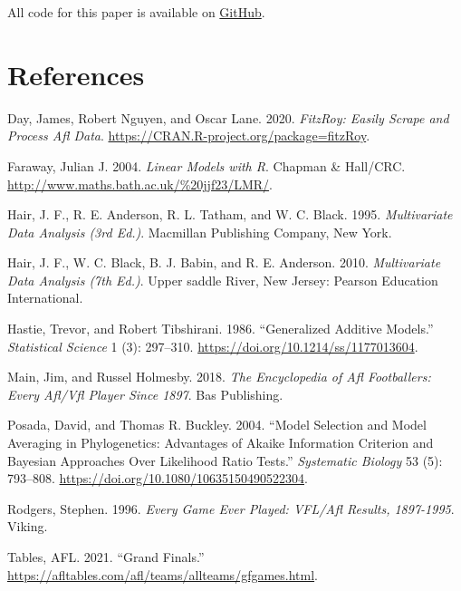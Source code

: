\documentclass{article}
\begin{document}
All code for this paper is available on \href{https://github.com/hendersontrent/phd-coursework/tree/main/olet5608}{GitHub}.

\pagebreak

\hypertarget{references}{%
\section*{References}\label{references}}

\hypertarget{refs}{}
\leavevmode\hypertarget{ref-fitzRoy}{}%
Day, James, Robert Nguyen, and Oscar Lane. 2020. \emph{FitzRoy: Easily Scrape and Process Afl Data}. \url{https://CRAN.R-project.org/package=fitzRoy}.

\leavevmode\hypertarget{ref-R:Faraway:2004}{}%
Faraway, Julian J. 2004. \emph{Linear Models with R}. Chapman \& Hall/CRC. \url{http://www.maths.bath.ac.uk/\%20jjf23/LMR/}.

\leavevmode\hypertarget{ref-multi2}{}%
Hair, J. F., R. E. Anderson, R. L. Tatham, and W. C. Black. 1995. \emph{Multivariate Data Analysis (3rd Ed.)}. Macmillan Publishing Company, New York.

\leavevmode\hypertarget{ref-multi1}{}%
Hair, J. F., W. C. Black, B. J. Babin, and R. E. Anderson. 2010. \emph{Multivariate Data Analysis (7th Ed.)}. Upper saddle River, New Jersey: Pearson Education International.

\leavevmode\hypertarget{ref-10.1214ux2fssux2f1177013604}{}%
Hastie, Trevor, and Robert Tibshirani. 1986. ``Generalized Additive Models.'' \emph{Statistical Science} 1 (3): 297--310. \url{https://doi.org/10.1214/ss/1177013604}.

\leavevmode\hypertarget{ref-everyone}{}%
Main, Jim, and Russel Holmesby. 2018. \emph{The Encyclopedia of Afl Footballers: Every Afl/Vfl Player Since 1897}. Bas Publishing.

\leavevmode\hypertarget{ref-10.1080ux2f10635150490522304}{}%
Posada, David, and Thomas R. Buckley. 2004. ``Model Selection and Model Averaging in Phylogenetics: Advantages of Akaike Information Criterion and Bayesian Approaches Over Likelihood Ratio Tests.'' \emph{Systematic Biology} 53 (5): 793--808. \url{https://doi.org/10.1080/10635150490522304}.

\leavevmode\hypertarget{ref-everygame}{}%
Rodgers, Stephen. 1996. \emph{Every Game Ever Played: VFL/Afl Results, 1897-1995}. Viking.

\leavevmode\hypertarget{ref-attendance}{}%
Tables, AFL. 2021. ``Grand Finals.'' \url{https://afltables.com/afl/teams/allteams/gfgames.html}.
\end{document}
